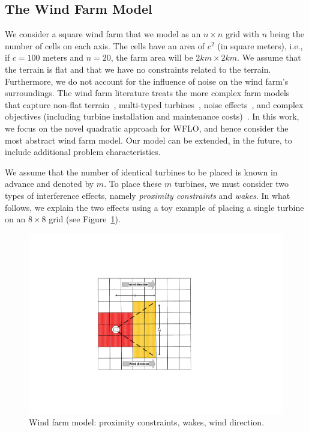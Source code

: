 \documentclass[preprint,12pt]{elsarticle}
\begin{document}
\subsection{The Wind Farm Model}

We consider a square wind farm that we model as an $n\times n$
grid with $n$ being the number of cells on each axis.  The cells have
an area of $c^2$ (in square meters), i.e., if $c=100$ meters and
$n=20$, the farm area will be $2km\times 2km$.  We
assume that the terrain is flat and that we have no constraints
related to the terrain.  Furthermore, we do not account for the
influence of noise on the wind farm's surroundings. The wind farm
literature treats the more complex farm models that capture non-flat
terrain~\cite{song2015lazy,kuo2016wind}, multi-typed
turbines~\cite{feng2017design}, noise
effects~\cite{Zhang2014,sorkhabi2016impact,yin2014multi}, and complex
objectives (including turbine installation and maintenance
costs)~\cite{lackner2007analytical,sorkhabi2018constrained}.  In this work, we focus on the
novel quadratic approach for WFLO, and hence consider the most
abstract wind farm model. Our model can be extended, in the
future, to include additional problem characteristics.
 
We assume that the number of identical turbines to be placed is known 
in advance and denoted by $m$. To place these $m$ turbines, 
we must consider two types of interference effects, namely \emph{proximity constraints} and \emph{wakes}.
In what follows, we explain the two effects using a toy example of placing a single turbine on an 
$8\times8$ grid (see Figure~\ref{fig:field_model}).

\begin{figure}[t]
	\centering
	\includegraphics[scale = 0.9]{field_model.pdf}

	\caption{Wind farm model: proximity constraints, wakes, wind direction.}\label{fig:field_model}
\end{figure}
\end{document}
